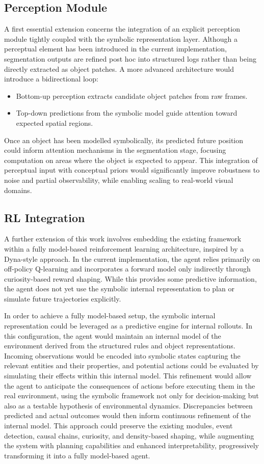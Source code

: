 \documentclass[12pt,a4paper]{report}
\begin{document}
\subsection{Perception Module}
A first essential extension concerns the integration of an explicit perception module tightly coupled with the symbolic representation layer. Although a perceptual element has been introduced in the current implementation, segmentation outputs are refined post hoc into structured logs rather than being directly extracted as object patches. A more advanced architecture would introduce a bidirectional loop:
\begin{itemize}
     \item Bottom-up perception extracts candidate object patches from raw frames.
     \item Top-down predictions from the symbolic model guide attention toward expected spatial regions.
\end{itemize}
Once an object has been modelled symbolically, its predicted future position could inform attention mechanisms in the segmentation stage, focusing computation on areas where the object is expected to appear. This integration of perceptual input with conceptual priors would significantly improve robustness to noise and partial observability, while enabling scaling to real-world visual domains.


\subsection{RL Integration}
A further extension of this work involves embedding the existing framework within a fully model-based reinforcement learning architecture, inspired by a Dyna-style approach. In the current implementation, the agent relies primarily on off-policy Q-learning and incorporates a forward model only indirectly through curiosity-based reward shaping. While this provides some predictive information, the agent does not yet use the symbolic internal representation to plan or simulate future trajectories explicitly.

In order to achieve a fully model-based setup, the symbolic internal representation could be leveraged as a predictive engine for internal rollouts. In this configuration, the agent would maintain an internal model of the environment derived from the structured rules and object representations. Incoming observations would be encoded into symbolic states capturing the relevant entities and their properties, and potential actions could be evaluated by simulating their effects within this internal model. This refinement would allow the agent to anticipate the consequences of actions before executing them in the real environment, using the symbolic framework not only for decision-making but also as a testable hypothesis of environmental dynamics. Discrepancies between predicted and actual outcomes would then inform continuous refinement of the internal model. This approach could preserve the existing modules, event detection, causal chains, curiosity, and density-based shaping, while augmenting the system with planning capabilities and enhanced interpretability, progressively transforming it into a fully model-based agent.
\end{document}
